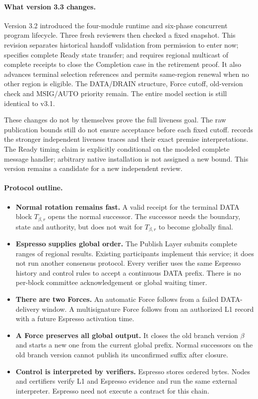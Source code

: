 \documentclass[11pt,a4paper]{article}
\newcounter{protocol}
\begin{document}
\paragraph{What version 3.3 changes.}
Version 3.2 introduced the four-module runtime and six-phase concurrent
program lifecycle. Three fresh reviewers then checked a fixed snapshot.
This revision separates historical handoff validation from permission
to enter now; specifies complete Ready state transfer; and requires
regional multicast of complete receipts to close the Completion case
in the retirement proof. It also advances terminal selection references
and permits same-region renewal when no other region is eligible.
The DATA/DRAIN structure, Force cutoff, old-version check and MSIG/AUTO
priority remain. The entire model section is still identical to v3.1.

These changes do not by themselves prove the full liveness goal.
The raw publication bounds still do not ensure acceptance before each
fixed cutoff.  records the stronger
independent liveness traces and their exact premise interpretations.
The Ready timing claim is explicitly conditional on the modeled complete
message handler; arbitrary native installation is not assigned a new
bound. This version remains a candidate for a new independent review.

\paragraph{Protocol outline.}
\begin{itemize}
\item \textbf{Normal rotation remains fast.} A valid receipt for the
terminal DATA block $T_{\beta,r}$ opens the normal successor. The successor
needs the boundary, state and authority, but does not wait for $T_{\beta,r}$
to become globally final.
\item \textbf{Espresso supplies global order.} The Publish Layer submits
complete ranges of regional results. Existing participants implement this
service; it does not run another consensus protocol. Every verifier uses the same
Espresso history and control rules to accept a continuous DATA prefix.
There is no per-block committee acknowledgement or global waiting timer.
\item \textbf{There are two Forces.} An automatic Force follows from
a failed DATA-delivery window. A multisignature Force follows from an
authorized L1 record with a future Espresso activation time.
\item \textbf{A Force preserves all global output.} It closes the old
branch version $\beta$ and starts a new one from the current
global prefix. Normal successors on the old branch version cannot publish its
unconfirmed suffix after closure.
\item \textbf{Control is interpreted by verifiers.} Espresso stores
ordered bytes. Nodes and certifiers verify L1 and Espresso evidence and
run the same external interpreter. Espresso need not execute a contract
for this chain.
\end{itemize}
\end{document}
